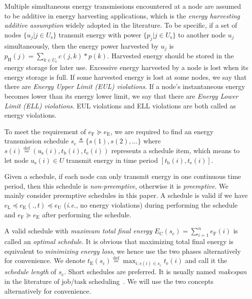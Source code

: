 \documentclass[journal,10pt]{IEEEtran}
\begin{document}
Multiple simultaneous energy transmissions encountered at a node are assumed to be additive in energy harvesting applications, which is the \textit{energy harvesting additive assumption} widely adopted in the literature\cite{He2013,Dai2017TON,Dai2018TON}. To be specific, if a set of nodes $\{u_j|j{\in}U_\text{s}\}$ transmit energy with power $\{p_j|j{\in}U_\text{s}\}$ to another node $u_j$ simultaneously, then the energy power harvested by $u_j$ is $p_\text{H}(j){=}\sum_{k{\in}U_\text{s}}c(j,k){*}p(k)$. Harvested energy should be stored in the energy storage for later use. Excessive energy harvested by a node is lost when its energy storage is full. If some harvested energy is lost at some nodes, we say that there are \textit{Energy Upper Limit (EUL) violations}. If a node's instantaneous energy becomes lower than its energy lower limit, we say that there are \textit{Energy Lower Limit (ELL) violations}. EUL violations and ELL violations are both called as energy violations.

To meet the requirement of $e_\text{F}{\succeq}e_\text{E}$, we are required to find an energy transmission schedule $s_\text{c}{\triangleq}\{s(1),s(2),\ldots\}$ where $s(i){\mathop{=}\limits^\text{def}}(u_\text{s}(i), t_\text{b}(i),t_\text{e}(i))$ represents a schedule item, which means to let node $u_\text{s}(i){\in}U$ transmit energy in time period $[t_\text{b}(i),t_\text{e}(i)]$.

Given a schedule, if each node can only transmit energy in one continuous time period, then this schedule is \textit{non-preemptive}, otherwise it is \textit{preemptive}. We mainly consider preemptive schedules in this paper. A schedule is valid if we have $e_\text{L}{\preceq}e_\text{E}(.,t){\preceq}e_\text{U}$ (\textit{i.e.}, no energy violations) during performing the schedule and $e_\text{F}{\succeq}e_\text{E}$ after performing the schedule.

A valid schedule with \textit{maximum total final energy} $E_\text{C}(s_\text{c}){=}\sum_{i{=}1}^{n}e_\text{F}(i)$ is called an \textit{optimal schedule}. It is obvious that maximizing total final energy is equivalent to \textit{minimizing energy loss}, we hence use the two phases alternatively for convenience. We denote $t_\text{E}(s_\text{c}){\mathop{=}\limits^\text{def}}\max_{i{:}s(i){\in}s_\text{c}}t_\text{e}(i)$ and call it the \textit{schedule length} of $s_\text{c}$. Short schedules are preferred. It is usually named \textit{makespan} in the literature of job/task scheduling~\cite{Marx2004}. We will use the two concepts alternatively for convenience.
\end{document}
